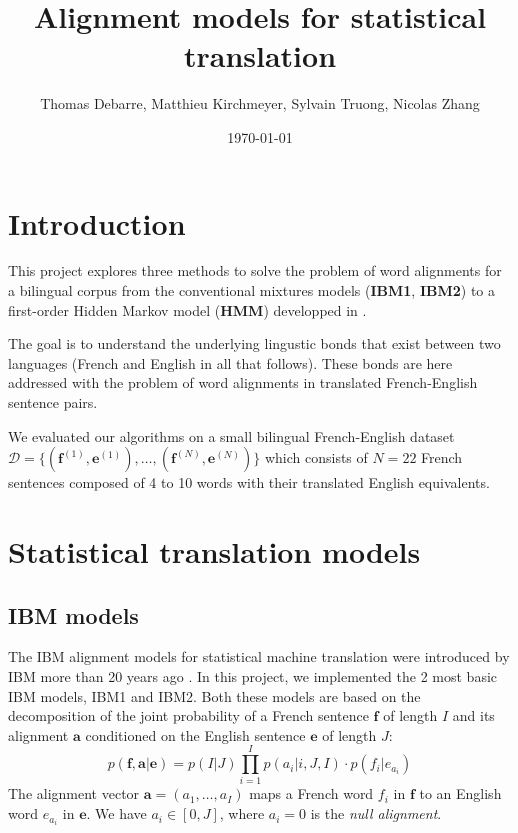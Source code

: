 \documentclass[final]{beamer}
\title
[Probabilistic Graphical Models Poster Session, Wed 4 Jan 2017] %
{ %
Alignment models for statistical translation
}
\author{ %
Thomas Debarre, Matthieu Kirchmeyer, Sylvain Truong, Nicolas Zhang
}
\institute
{\mbox{}
}
\date{\today}
\begin{document}
\begin{frame}[t]
\begin{multicols}{3}

\section{Introduction}

This project explores three methods to solve the problem of word alignments for a bilingual corpus from the conventional mixtures models (\textbf{IBM1}, \textbf{IBM2}) to a first-order Hidden Markov model (\textbf{HMM}) developped in \cite{vogel}. 

The goal is to understand the underlying lingustic bonds that exist between two languages (French and English in all that follows). These bonds are here addressed with the problem of word alignments in translated French-English sentence pairs.

We evaluated our algorithms on a small bilingual French-English dataset $\mathcal{D} = \{ (\textbf{f}^{(1)},\textbf{e}^{(1)}), \dots , (\textbf{f}^{(N)},\textbf{e}^{(N)})\}$ which consists of $N = 22$ French sentences composed of 4 to 10 words with their translated English equivalents. 

\section{Statistical translation models}

\subsection{IBM models}
The IBM alignment models for statistical machine translation were introduced by IBM more than 20 years ago \cite{brown}. In this project, we implemented the 2 most basic IBM models, IBM1 and IBM2. Both these models are based on the decomposition of the joint probability of a French sentence $\textbf{f}$ of length $I$ and its alignment $\textbf{a}$ conditioned on the English sentence $\textbf{e}$ of length $J$:
\begin{equation*}
p(\textbf{f}, \textbf{a} \vert \textbf{e}) = p(I \vert J) \prod_{i=1}^I p(a_i \vert i, J, I) \cdot p(f_i \vert e_{a_i})
\end{equation*}
The alignment vector $\textbf{a} = (a_1, \hdots, a_I)$ maps a French word $f_i$ in $\textbf{f}$ to an English word $e_{a_i}$ in $\textbf{e}$. We have $a_i \in [0, J]$, where $a_i = 0$ is the \textit{null alignment}.


\end{multicols}
\end{frame}
\end{document}
